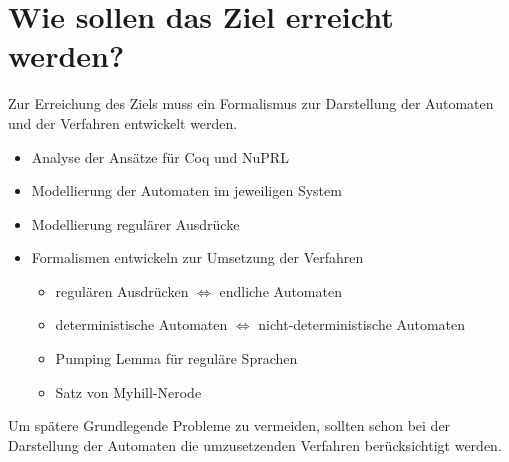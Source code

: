 \section{Wie sollen das Ziel erreicht werden?}
Zur Erreichung des Ziels muss ein Formalismus zur Darstellung der Automaten und der Verfahren entwickelt werden. 
\begin{itemize}
 \item Analyse der Ans\"atze f\"ur Coq und NuPRL
 \item Modellierung der Automaten im jeweiligen System
 \item Modellierung regul\"arer Ausdr\"ucke
 \item Formalismen entwickeln zur Umsetzung der Verfahren
 \begin{itemize}
  \item regul\"aren Ausdr\"ucken $\Leftrightarrow$ endliche Automaten
  \item deterministische Automaten $\Leftrightarrow$ nicht-deterministische Automaten
  \item Pumping Lemma f\"ur regul\"are Sprachen
  \item Satz von Myhill-Nerode
 \end{itemize}
\end{itemize}
Um sp\"atere Grundlegende Probleme zu vermeiden, sollten schon bei der Darstellung der Automaten die umzusetzenden Verfahren ber\"ucksichtigt werden.

